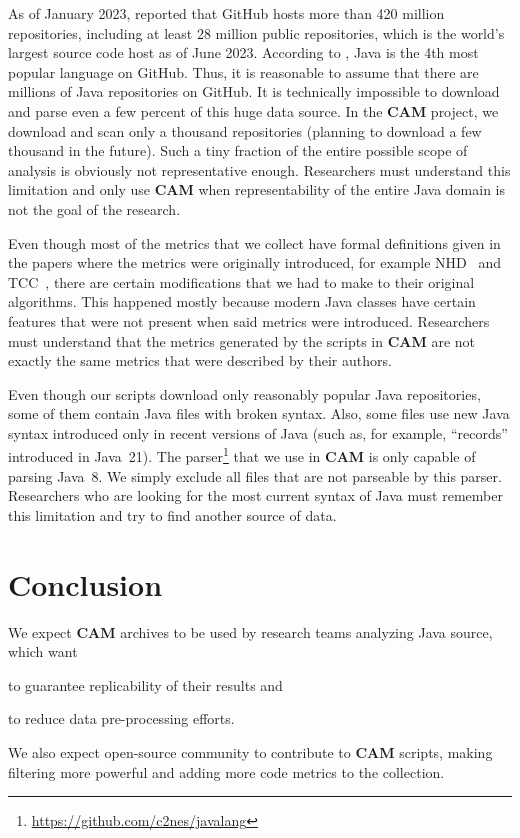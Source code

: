 \documentclass[11pt,sigplan,nonacm]{acmart}
\newcommand\cam{{\sffamily\bfseries CAM}}
\begin{document}
As of January 2023, \citet{dohmke2023} reported that GitHub hosts more than 420 million repositories, including at least 28 million public repositories, which is the world's largest source code host as of June 2023. According to \citep{daigle2023}, Java is the 4th most popular language on GitHub. Thus, it is reasonable to assume that there are millions of Java repositories on GitHub. It is technically impossible to download and parse even a few percent of this huge data source. In the \cam{} project, we download and scan only a thousand repositories (planning to download a few thousand in the future). Such a tiny fraction of the entire possible scope of analysis is obviously not representative enough. Researchers must understand this limitation and only use \cam{} when representability of the entire Java domain is not the goal of the research.

Even though most of the metrics that we collect have formal definitions given in the papers where the metrics were originally introduced, for example NHD~\citep{counsell2006interpretation} and TCC~\citep{bieman1995cohesion}, there are certain modifications that we had to make to their original algorithms. This happened mostly because modern Java classes have certain features that were not present when said metrics were introduced. Researchers must understand that the metrics generated by the scripts in \cam{} are not exactly the same metrics that were described by their authors.

Even though our scripts download only reasonably popular Java repositories, some of them contain Java files with broken syntax. Also, some files use new Java syntax introduced only in recent versions of Java (such as, for example, ``records'' introduced in Java~21). The parser\footnote{\url{https://github.com/c2nes/javalang}} that we use in \cam{} is only capable of parsing Java~8. We simply exclude all files that are not parseable by this parser. Researchers who are looking for the most current syntax of Java must remember this limitation and try to find another source of data.

\section{Conclusion}

We expect \cam{} archives to be used by research teams analyzing Java source, which want
\begin{inparaenum}[(a)]
\item to guarantee replicability of their results
and
\item to reduce data pre-processing efforts.
\end{inparaenum}
We also expect open-source community to contribute to \cam{} scripts, making filtering more powerful and adding more code metrics to the collection.

{\raggedright

}
\end{document}
